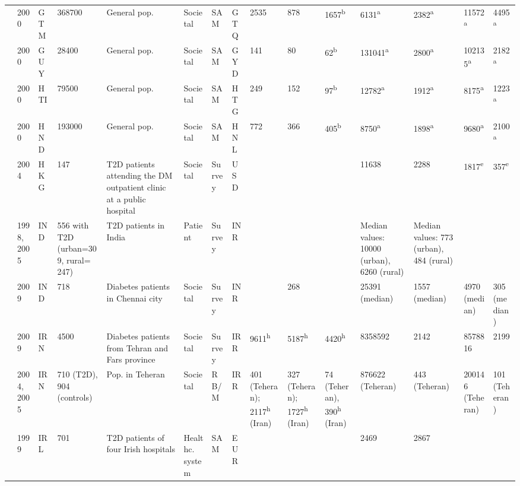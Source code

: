 {\begin{landscape}
\begin{tabularx}{\linewidth}{Z X X Z Z X X X X X X X X Y Y}
\textcite{Barcelo2003} & 2000 & GTM & 368700 & General pop. & Societal & SAM & GTQ & 2535 & 878 & 1657\textsuperscript{b} & 6131\textsuperscript{a} & 2382\textsuperscript{a} & 11572\textsuperscript{a} & 4495\textsuperscript{a} \\
\textcite{Barcelo2003} & 2000 & GUY & 28400 & General pop. & Societal & SAM & GYD & 141 & 80 & 62\textsuperscript{b} & 131041\textsuperscript{a} & 2800\textsuperscript{a} & 102135\textsuperscript{a} & 2182\textsuperscript{a} \\
\textcite{Barcelo2003} & 2000 & HTI & 79500 & General pop. & Societal & SAM & HTG & 249 & 152 & 97\textsuperscript{b} & 12782\textsuperscript{a} & 1912\textsuperscript{a} & 8175\textsuperscript{a} & 1223\textsuperscript{a} \\
\textcite{Barcelo2003} & 2000 & HND & 193000 & General pop. & Societal & SAM & HNL & 772 & 366 & 405\textsuperscript{b} & 8750\textsuperscript{a} & 1898\textsuperscript{a} & 9680\textsuperscript{a} & 2100\textsuperscript{a} \\
\textcite{Chan2007a} & 2004 & HKG & 147 & T2D patients attending the DM outpatient   clinic at a public hospital & Societal & Survey & USD &  &  &  & 11638 & 2288 & 1817\textsuperscript{e} & 357\textsuperscript{e} \\
\textcite{Ramachandran2007d} & 1998,  2005 & IND & 556 with T2D (urban=309, rural= 247) & T2D patients in India & Patient & Survey & INR &  &  &  & Median values: 10000 (urban), 6260 (rural) & Median values: 773 (urban), 484 (rural) &  &  \\
\textcite{Tharkar2010a} & 2009 & IND & 718 & Diabetes patients in Chennai city & Societal & Survey & INR &  & 268 &  & 25391 (median) & 1557 (median) & 4970 (median) & 305 (median) \\
\textcite{Javanbakht2011b} & 2009 & IRN & 4500 & Diabetes patients from Tehran and Fars   province & Societal & Survey & IRR & 9611\textsuperscript{h} & 5187\textsuperscript{h} & 4420\textsuperscript{h} & 8358592 & 2142 & 8578816 & 2199 \\
\textcite{Esteghamati2009} & 2004, 2005 & IRN & 710 (T2D), 904 (controls) & Pop. in Teheran & Societal & RB/M & IRR & 401 (Teheran); 2117\textsuperscript{h}   (Iran) & 327 (Teheran); 1727\textsuperscript{h}   (Iran) & 74 (Teheran), 390\textsuperscript{h}   (Iran) & 876622 (Teheran) & 443 (Teheran) & 200146 (Teheran) & 101 (Teheran) \\
\textcite{Nolan2006c} & 1999 & IRL & 701 & T2D patients of   four Irish hospitals & Healthc. system & SAM & EUR &  &  &  & 2469 & 2867 &  &  \\

\end{tabularx}
\end{landscape}}
